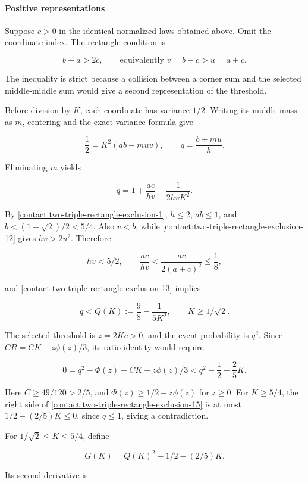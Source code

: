 \paragraph{Positive representations}

Suppose $c>0$ in the identical normalized laws obtained above. Omit the
coordinate index. The rectangle condition is

\[
 b-a>2c,\qquad\text{equivalently }v=b-c>u=a+c.
\tag{B.8.12}\label{contact:two-triple-rectangle-exclusion-12}
\]

The inequality is strict because a collision between a corner sum and
the selected middle-middle sum would give a second representation of the threshold.

Before division by $K$, each coordinate has variance $1/2$.
Writing its middle mass as $m$,
centering and the exact variance formula give

\[
 \frac12=K^2(ab-muv),\qquad q=\frac{b+mu}{h}.
\]

Eliminating $m$ yields

\[
 q=1+\frac{ac}{hv}-\frac1{2hvK^2}.
\tag{B.8.13}\label{contact:two-triple-rectangle-exclusion-13}
\]

By \eqref{contact:two-triple-rectangle-exclusion-1}, $h\le 2$, $ab\le 1$, and $b<(1+\sqrt{2})/2<5/4$.
Also $v<b$, while \eqref{contact:two-triple-rectangle-exclusion-12} gives $hv>2u^2$. Therefore

\[
 hv<5/2,\qquad
 \frac{ac}{hv}<\frac{ac}{2(a+c)^2}\leq\frac18,
\]

and \eqref{contact:two-triple-rectangle-exclusion-13} implies

\[
 q<Q(K):=\frac98-\frac1{5K^2},\qquad K\geq1/\sqrt2.
\tag{B.8.14}\label{contact:two-triple-rectangle-exclusion-14}
\]

The selected threshold is $z=2Kc>0$, and the event probability is $q^2$.
Since $C R=C K-z \phi(z)/3$, its ratio identity would require

\[
 0=q^2-\Phi(z)-CK+z\phi(z)/3
   <q^2-\frac12-\frac25K.
\tag{B.8.15}\label{contact:two-triple-rectangle-exclusion-15}
\]

Here $C\ge49/120>2/5$, and $\Phi(z)\ge 1/2+z \phi(z)$ for $z\ge 0$.
For $K\ge 5/4$, the right side of \eqref{contact:two-triple-rectangle-exclusion-15} is at most
$1/2-(2/5)K\le 0$, since $q\le 1$, giving a contradiction.

For $1/\sqrt{2}\le K\le 5/4$, define

\[
 G(K)=Q(K)^2-1/2-(2/5)K.
\]

Its second derivative is

